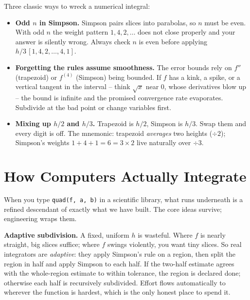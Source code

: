 \begin{trapbox}
Three classic ways to wreck a numerical integral:
\begin{itemize}
\item \textbf{Odd $n$ in Simpson.} Simpson pairs slices into parabolas, so $n$ must be even. With odd $n$ the weight pattern $1,4,2,\dots$ does not close properly and your answer is silently wrong. Always check $n$ is even before applying $h/3\,[1,4,2,\dots,4,1]$.
\item \textbf{Forgetting the rules assume smoothness.} The error bounds rely on $f''$ (trapezoid) or $f^{(4)}$ (Simpson) being bounded. If $f$ has a kink, a spike, or a vertical tangent in the interval -- think $\sqrt{x}$ near $0$, whose derivatives blow up -- the bound is infinite and the promised convergence rate evaporates. Subdivide at the bad point or change variables first.
\item \textbf{Mixing up $h/2$ and $h/3$.} Trapezoid is $h/2$, Simpson is $h/3$. Swap them and every digit is off. The mnemonic: trapezoid \emph{averages} two heights ($\div 2$); Simpson's weights $1{+}4{+}1 = 6 = 3\times 2$ live naturally over $\div 3$.
\end{itemize}
\end{trapbox}

\section{How Computers Actually Integrate}
\label{ch27:computers}

When you type \texttt{quad(f, a, b)} in a scientific library, what runs underneath is a refined descendant of exactly what we have built. The core ideas survive; engineering wraps them.

\textbf{Adaptive subdivision.} A fixed, uniform $h$ is wasteful. Where $f$ is nearly straight, big slices suffice; where $f$ swings violently, you want tiny slices. So real integrators are \emph{adaptive}: they apply Simpson's rule on a region, then split the region in half and apply Simpson to each half. If the two-half estimate agrees with the whole-region estimate to within tolerance, the region is declared done; otherwise each half is recursively subdivided. Effort flows automatically to wherever the function is hardest, which is the only honest place to spend it.

